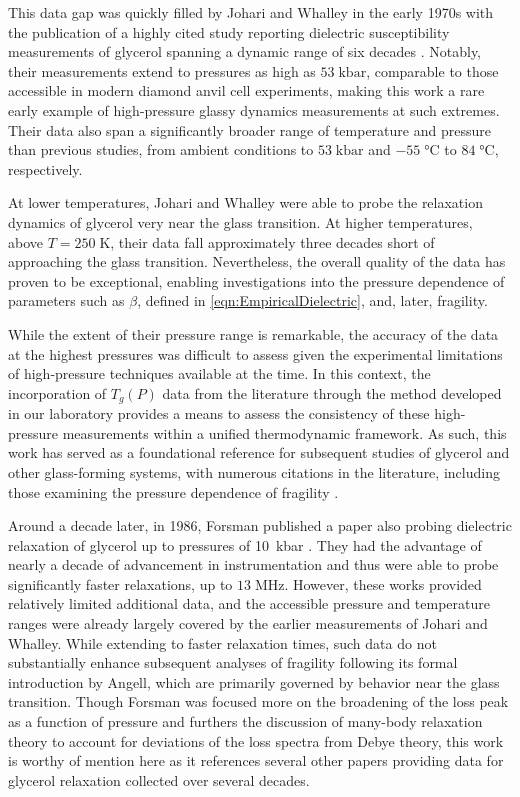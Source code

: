 This data gap was quickly filled by Johari and Whalley in the early 1970s with the publication of a highly cited study reporting dielectric susceptibility measurements of glycerol spanning a dynamic range of six decades \nolinebreak\cite{JohariWhalley}. Notably, their measurements extend to pressures as high as $53\;\si{\kilo\bar}$, comparable to those accessible in modern diamond anvil cell experiments, making this work a rare early example of high-pressure glassy dynamics measurements at such extremes. Their data also span a significantly broader range of temperature and pressure than previous studies, from ambient conditions to $53\;\si{\kilo\bar}$ and $-55\;\si{\degreeCelsius}$ to $84\;\si{\degreeCelsius}$, respectively.

At lower temperatures, Johari and Whalley were able to probe the relaxation dynamics of glycerol very near the glass transition. At higher temperatures, above $T = 250\;\si{\kelvin}$, their data fall approximately three decades short of approaching the glass transition. Nevertheless, the overall quality of the data has proven to be exceptional, enabling investigations into the pressure dependence of parameters such as $\beta$, defined in \eqn\nolinebreak \ref{eqn:EmpiricalDielectric}, and, later, fragility.

While the extent of their pressure range is remarkable, the accuracy of the data at the highest pressures was difficult to assess given the experimental limitations of high-pressure techniques available at the time. In this context, the incorporation of $T_g(P)$ data from the literature through the \tgp method developed in our laboratory provides a means to assess the consistency of these high-pressure measurements within a unified thermodynamic framework. As such, this work has served as a foundational reference for subsequent studies of glycerol and other glass-forming systems, with numerous citations in the literature, including those examining the pressure dependence of fragility \nolinebreak\cite{Johari2,Paluch,Forsman,Pawlus}.

Around a decade later, in 1986, Forsman \etal published a paper also probing dielectric relaxation of glycerol up to pressures of 10~kbar \nolinebreak \cite{Forsman}.  They had the advantage of nearly a decade of advancement in instrumentation and thus were able to probe significantly faster relaxations, up to $13\;\si{\mega\hertz}$.  However, these works provided relatively limited additional data, and the accessible pressure and temperature ranges were already largely covered by the earlier measurements of Johari and Whalley. While extending to faster relaxation times, such data do not substantially enhance subsequent analyses of fragility following its formal introduction by Angell, which are primarily governed by behavior near the glass transition. Though Forsman was focused more on the broadening of the loss peak as a function of pressure and furthers the discussion of many-body relaxation theory to account for deviations of the loss spectra from Debye theory, this work is worthy of mention here as it references several other papers providing data for glycerol relaxation collected over several decades.

